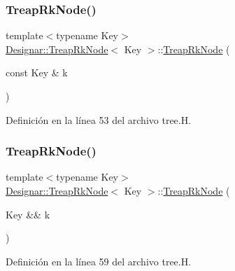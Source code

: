 \subsubsection{\texorpdfstring{Treap\+Rk\+Node()}{TreapRkNode()}\hspace{0.1cm}{\footnotesize\ttfamily [2/4]}}
{\footnotesize\ttfamily template$<$typename Key$>$ \\
\hyperlink{class_designar_1_1_treap_rk_node}{Designar\+::\+Treap\+Rk\+Node}$<$ Key $>$\+::\hyperlink{class_designar_1_1_treap_rk_node}{Treap\+Rk\+Node} (\begin{DoxyParamCaption}\item[{const Key \&}]{k }\end{DoxyParamCaption})\hspace{0.3cm}{\ttfamily [inline]}}



Definición en la línea 53 del archivo tree.\+H.

\mbox{\label{class_designar_1_1_treap_rk_node_a81c5eee2937311cfee5b30a03cd16a04}} 
\subsubsection{\texorpdfstring{Treap\+Rk\+Node()}{TreapRkNode()}\hspace{0.1cm}{\footnotesize\ttfamily [3/4]}}
{\footnotesize\ttfamily template$<$typename Key$>$ \\
\hyperlink{class_designar_1_1_treap_rk_node}{Designar\+::\+Treap\+Rk\+Node}$<$ Key $>$\+::\hyperlink{class_designar_1_1_treap_rk_node}{Treap\+Rk\+Node} (\begin{DoxyParamCaption}\item[{Key \&\&}]{k }\end{DoxyParamCaption})\hspace{0.3cm}{\ttfamily [inline]}}



Definición en la línea 59 del archivo tree.\+H.

\mbox{\label{class_designar_1_1_treap_rk_node_aeac25432a807225359883033f50404eb}} 
